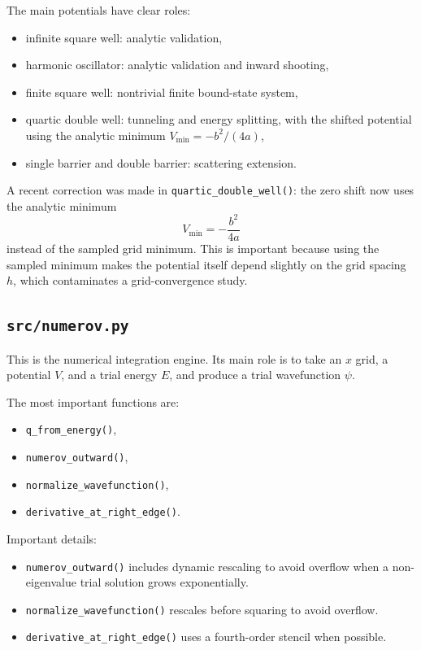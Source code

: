 \documentclass[11pt]{article}
\begin{document}
    The main potentials have clear roles:
    \begin{itemize}
        \item infinite square well: analytic validation,
        \item harmonic oscillator: analytic validation and inward shooting,
        \item finite square well: nontrivial finite bound-state system,
        \item quartic double well: tunneling and energy splitting, with the shifted potential using the analytic minimum $V_{\min}=-b^2/(4a)$,
        \item single barrier and double barrier: scattering extension.
    \end{itemize}

    A recent correction was made in \texttt{quartic\_double\_well()}: the zero shift now uses the analytic minimum
    \begin{equation}
        V_{\min}=-\frac{b^2}{4a}
    \end{equation}
    instead of the sampled grid minimum. This is important because using the sampled minimum makes the potential itself depend slightly on the grid spacing $h$, which contaminates a grid-convergence study.

    \subsection{\texttt{src/numerov.py}}

    This is the numerical integration engine. Its main role is to take an $x$ grid, a potential $V$, and a trial energy $E$, and produce a trial wavefunction $\psi$.

    The most important functions are:
    \begin{itemize}
        \item \texttt{q\_from\_energy()},
        \item \texttt{numerov\_outward()},
        \item \texttt{normalize\_wavefunction()},
        \item \texttt{derivative\_at\_right\_edge()}.
    \end{itemize}

    Important details:
    \begin{itemize}
        \item \texttt{numerov\_outward()} includes dynamic rescaling to avoid overflow when a non-eigenvalue trial solution grows exponentially.
        \item \texttt{normalize\_wavefunction()} rescales before squaring to avoid overflow.
        \item \texttt{derivative\_at\_right\_edge()} uses a fourth-order stencil when possible.
    \end{itemize}
\end{document}
